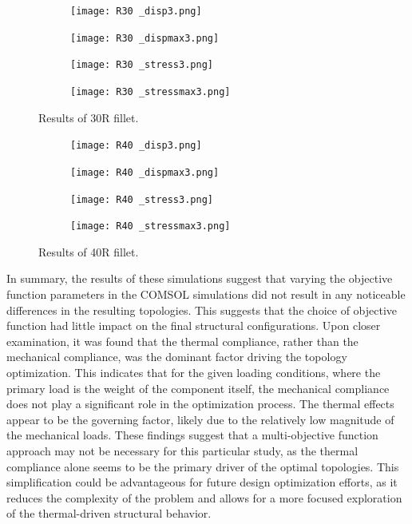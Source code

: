 \documentclass[../main.tex]{subfiles}
\begin{document}
\begin{figure}
  \centering 
  \begin{subfigure}[b]{0.45\textwidth}
    \centering 
    \texttt{[image: R30 \_disp3.png]}
    \label{}
  \end{subfigure}
  \begin{subfigure}[b]{0.45\textwidth}
    \centering 
    \texttt{[image: R30 \_dispmax3.png]}
    \label{}
  \end{subfigure}
  \begin{subfigure}[b]{0.45\textwidth}
    \centering 
    \texttt{[image: R30 \_stress3.png]}
    \label{}
  \end{subfigure}
  \begin{subfigure}[b]{0.45\textwidth}
    \centering 
    \texttt{[image: R30 \_stressmax3.png]}
    \label{}
  \end{subfigure}
  \caption{Results of 30R fillet.}
  \label{fig:30r_results}
\end{figure}

\begin{figure}
  \centering 
  \begin{subfigure}[b]{0.45\textwidth}
    \centering 
    \texttt{[image: R40 \_disp3.png]}
    \label{}
  \end{subfigure}
  \begin{subfigure}[b]{0.45\textwidth}
    \centering 
    \texttt{[image: R40 \_dispmax3.png]}
    \label{}
  \end{subfigure}
  \begin{subfigure}[b]{0.45\textwidth}
    \centering 
    \texttt{[image: R40 \_stress3.png]}
    \label{}
  \end{subfigure}
  \begin{subfigure}[b]{0.45\textwidth}
    \centering 
    \texttt{[image: R40 \_stressmax3.png]}
    \label{}
  \end{subfigure}
  \caption{Results of 40R fillet.}
  \label{fig:40r_results}
\end{figure}

In summary, the results of these simulations suggest that varying the objective function parameters in the COMSOL simulations did not result in any noticeable differences in the resulting topologies. This suggests that the choice of objective function had little impact on the final structural configurations. Upon closer examination, it was found that the thermal compliance, rather than the mechanical compliance, was the dominant factor driving the topology optimization. This indicates that for the given loading conditions, where the primary load is the weight of the component itself, the mechanical compliance does not play a significant role in the optimization process. The thermal effects appear to be the governing factor, likely due to the relatively low magnitude of the mechanical loads. These findings suggest that a multi-objective function approach may not be necessary for this particular study, as the thermal compliance alone seems to be the primary driver of the optimal topologies. This simplification could be advantageous for future design optimization efforts, as it reduces the complexity of the problem and allows for a more focused exploration of the thermal-driven structural behavior.
\end{document}
